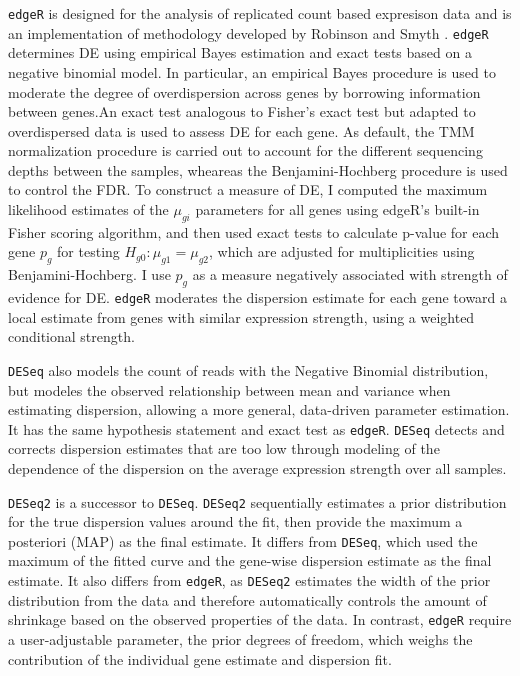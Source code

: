 \documentclass[11pt]{isuthesis}
\begin{document}
{\tt edgeR} is designed for the analysis of replicated count based expresison data and is an implementation of methodology developed by Robinson and Smyth \citep{robinson2007moderated}. {\tt edgeR} determines DE using empirical Bayes estimation and exact tests based on a negative binomial model. In particular, an empirical Bayes procedure is used to moderate the degree of overdispersion across genes by borrowing information between genes.An exact test analogous to Fisher's exact test but adapted to overdispersed data is used to assess DE for each gene. As default, the TMM normalization procedure is carried out to account for the different sequencing depths between the samples, wheareas the Benjamini-Hochberg procedure is used to control the FDR\citep{seyednasrollah2013comparison}. To construct a measure of DE, I computed the maximum likelihood estimates of the $\mu_{gi}$ parameters for all genes using edgeR's built-in Fisher scoring algorithm, and then used exact tests to calculate p-value for each gene $p_g$ for testing $H_{g0}: \mu_{g1} = \mu_{g2}$, which are adjusted for multiplicities using Benjamini-Hochberg. I use $p_g$ as a measure negatively associated with strength of evidence for DE. {\tt edgeR} moderates the dispersion estimate for each gene toward a local estimate from genes with similar expression strength, using a weighted conditional strength.

{\tt DESeq} also models the count of reads with the Negative Binomial distribution, but modeles the observed relationship between mean and variance when estimating dispersion, allowing a more general, data-driven parameter estimation\citep{seyednasrollah2013comparison}. It has the same hypothesis statement and exact test as {\tt edgeR}. {\tt DESeq} detects and corrects dispersion estimates that are too low through modeling of the dependence of the dispersion on the average expression strength over all samples. 

{\tt DESeq2} is a successor to {\tt DESeq}. {\tt DESeq2} sequentially estimates a prior distribution for the true dispersion values around the fit, then provide the maximum a posteriori (MAP) as the final estimate. It differs from {\tt DESeq}, which used the maximum of the fitted curve and the gene-wise dispersion estimate as the final estimate. It also differs from {\tt edgeR}, as {\tt DESeq2} estimates the width of the prior distribution from the data and therefore automatically controls the amount of shrinkage based on the observed properties of the data. In contrast, {\tt edgeR} require a user-adjustable parameter, the prior degrees of freedom, which weighs the contribution of the individual gene estimate and dispersion fit\citep{love2014moderated}. 
\end{document}
